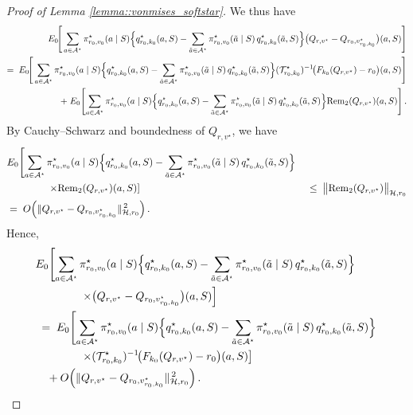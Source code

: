 \documentclass[11pt]{article}
\theoremstyle{plain}
\begin{document}
\begin{proof}[Proof of Lemma \ref{lemma::vonmises_softstar}]
We thus have
\begin{align*}
E_0\!\Bigg[\sum_{a \in \mathcal{A}^\star} \pi_{r_0,v_0}^\star(a \mid S)
   \Bigl\{ q_{r_0,k_0}^\star(a,S) - \sum_{\tilde a \in \mathcal{A}^\star} 
          \pi_{r_0,v_0}^\star(\tilde a \mid S)\, q_{r_0,k_0}^\star(\tilde a,S) \Bigr\}
   \bigl(Q_{r,v^\star} - Q_{r_0,v_{r_0,k_0}^\star}\bigr)(a,S)\Bigg] \\
=\;
E_0\!\Bigg[\sum_{a \in \mathcal{A}^\star} \pi_{r_0,v_0}^\star(a \mid S)
   \Bigl\{ q_{r_0,k_0}^\star(a,S) - \sum_{\tilde a \in \mathcal{A}^\star} 
          \pi_{r_0,v_0}^\star(\tilde a \mid S)\, q_{r_0,k_0}^\star(\tilde a,S) \Bigr\}
   (\mathcal{T}_{r_0,k_0}^\star)^{-1}\!\bigl(F_{k_0}(Q_{r,v^\star}) - r_0\bigr)(a,S)\Bigg] \\
\quad +\;
E_0\!\left[\sum_{a \in \mathcal{A}^\star} \pi_{r_0,v_0}^\star(a \mid S)
   \Bigl\{ q_{r_0,k_0}^\star(a,S) - \sum_{\tilde a \in \mathcal{A}^\star} 
          \pi_{r_0,v_0}^\star(\tilde a \mid S)\, q_{r_0,k_0}^\star(\tilde a,S) \Bigr\}
   \mathrm{Rem}_2(Q_{r,v^\star})(a,S)\right].
\end{align*}
By Cauchy--Schwarz and boundedness of \(Q_{r,v^\star}\), we have
\begin{align*}
&E_0\!\left[\sum_{a \in \mathcal{A}^\star} \pi_{r_0,v_0}^\star(a \mid S)
   \Bigl\{ q_{r_0,k_0}^\star(a,S) - \sum_{\tilde a \in \mathcal{A}^\star}
          \pi_{r_0,v_0}^\star(\tilde a \mid S)\, q_{r_0,k_0}^\star(\tilde a,S) \Bigr\}\right. \\
&\qquad\qquad \left.\times
   \mathrm{Rem}_2(Q_{r,v^\star})(a,S)\right]
&\;\le\; \bigl\|\mathrm{Rem}_2(Q_{r,v^\star})\bigr\|_{\mathcal{H},r_0} \\
&=\; O\!\left(\|Q_{r,v^\star} - Q_{r_0,v_{r_0,k_0}^\star}\|_{\mathcal{H},r_0}^{\,2}\right).
\end{align*}
Hence,
\begin{align*}
&E_0\!\left[\sum_{a \in \mathcal{A}^\star} \pi_{r_0,v_0}^\star(a \mid S)
   \Bigl\{ q_{r_0,k_0}^\star(a,S) - \sum_{\tilde a \in \mathcal{A}^\star}
          \pi_{r_0,v_0}^\star(\tilde a \mid S)\, q_{r_0,k_0}^\star(\tilde a,S) \Bigr\}\right. \\
&\qquad\qquad \left.\times
   \bigl(Q_{r,v^\star} - Q_{r_0,v_{r_0,k_0}^\star}\bigr)(a,S)\right] \\
&\;=\; E_0\!\left[\sum_{a \in \mathcal{A}^\star} \pi_{r_0,v_0}^\star(a \mid S)
   \Bigl\{ q_{r_0,k_0}^\star(a,S) - \sum_{\tilde a \in \mathcal{A}^\star}
          \pi_{r_0,v_0}^\star(\tilde a \mid S)\, q_{r_0,k_0}^\star(\tilde a,S) \Bigr\}\right. \\
&\qquad\qquad \left.\times
   (\mathcal{T}_{r_0,k_0}^\star)^{-1}\!\bigl(F_{k_0}(Q_{r,v^\star}) - r_0\bigr)(a,S)\right] \\
&\quad + O\!\left(\|Q_{r,v^\star} - Q_{r_0,v_{r_0,k_0}^\star}\|_{\mathcal{H},r_0}^{\,2}\right).
\end{align*}




\end{proof}
\end{document}
